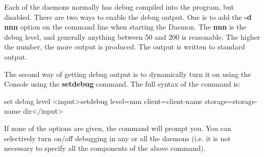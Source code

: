 Each of the daemons normally has debug compiled into the program, but
disabled. There are two ways to enable the debug output. One is to add the
{\bf -d nnn} option on the command line when starting the Daemon. 
The {\bf nnn} is the debug level, and generally anything between 50 and 200 is
reasonable. The higher the number, the more output is produced. The output is
written to standard output.

The second way of getting debug output is to dynamically turn it on using the
Console using the {\bf setdebug} command. The full syntax of the command is:

\begin{bconsole}{set debug level}
<input>setdebug level=nnn client=client-name storage=storage-name dir</input>
\end{bconsole}

If none of the options are given, the command will prompt you. You can
selectively turn on/off debugging in any or all the daemons (i.e. it is not
necessary to specify all the components of the above command).

